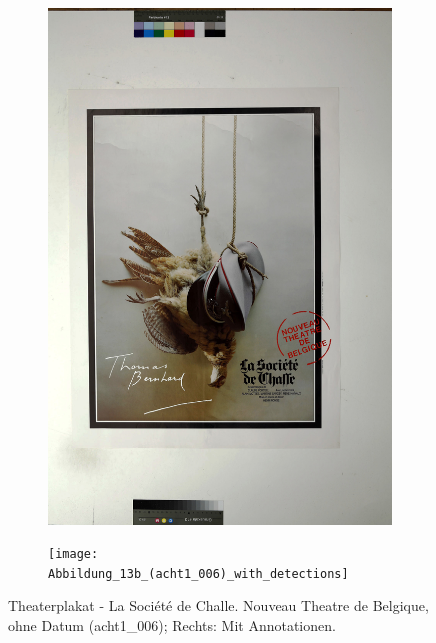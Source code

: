 \documentclass[a4paper,12pt,ngerman]{article}
\begin{document}
\newpage
\begin{landscape}
\begin{figure}[ht]
	\begin{subfigure}[b]{0.5\linewidth}
	\centering
	\includegraphics[height=\linewidth]{Abbildung_17_(acht1_006)}
	\end{subfigure}
	\begin{subfigure}[b]{0.5\linewidth}
	\centering
	\texttt{[image: Abbildung\_13b\_(acht1\_006)\_with\_detections]}
	\end{subfigure}
	\caption{Theaterplakat - La Société de Challe. Nouveau Theatre de Belgique, ohne Datum (acht1\_006); Rechts: Mit Annotationen.}
\end{figure}
\end{landscape}
\end{document}
